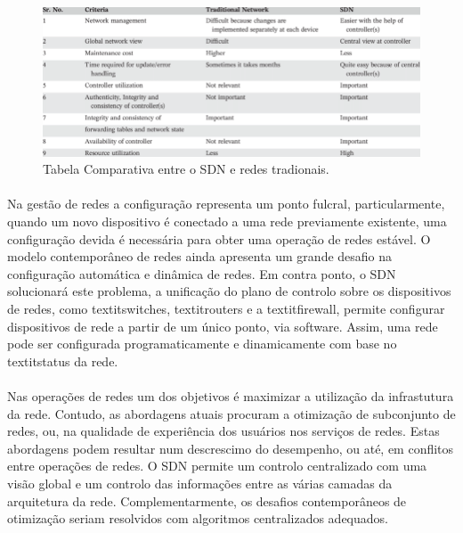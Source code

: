 \documentclass{llncs}
\begin{document}
\paragraph{}
\begin{figure}
\begin{center}
\includegraphics[scale=0.40]{tabela.png} 
\end{center}
\caption{Tabela Comparativa entre o SDN e redes tradionais.}
\label{fig:tabela}
\end{figure} 
\paragraph{}
Na gestão de redes a configuração representa um ponto fulcral, particularmente, quando um novo dispositivo é conectado a uma rede previamente existente, uma configuração
devida é necessária para obter uma operação de redes estável. O modelo contemporâneo de redes ainda apresenta um grande desafio na configuração automática e dinâmica de redes.
Em contra ponto, o SDN solucionará este problema, a unificação do plano de controlo sobre os dispositivos de redes, como textit{switches}, textit{routers} e a textit{firewall},
permite configurar dispositivos de rede a partir de um único ponto, via software. Assim, uma rede pode ser configurada programaticamente e dinamicamente com base no textit{status} da rede. \cite{paper1}
\paragraph{}
Nas operações de redes um dos objetivos é maximizar a utilização da infrastutura da rede. Contudo, as abordagens atuais procuram a otimização de subconjunto de redes, ou,
na qualidade de experiência dos usuários nos serviços de redes. Estas abordagens podem resultar num descrescimo do desempenho, ou até, em conflitos entre operações de redes. 
O SDN permite um controlo centralizado com uma visão global e um controlo das informações entre as várias camadas da arquitetura da rede. Complementarmente, os desafios contemporâneos
de otimização seriam resolvidos com algoritmos centralizados adequados.
\end{document}
